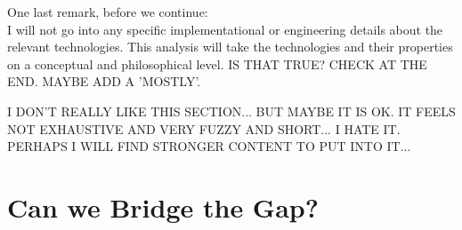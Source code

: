 \documentclass{article}
\newcounter{example}
\begin{document}
One last remark, before we continue:\\

I will not go into any specific implementational or engineering details about
the relevant technologies. This analysis will take the technologies and their
properties on a conceptual and philosophical level. IS THAT TRUE? CHECK AT THE
END. MAYBE ADD A 'MOSTLY'.
%
%
%
%
%
%
%

I DON'T REALLY LIKE THIS SECTION... BUT MAYBE IT IS OK. IT FEELS NOT EXHAUSTIVE
AND VERY FUZZY AND SHORT... I HATE IT. PERHAPS I WILL FIND STRONGER CONTENT TO
PUT INTO IT...

\section{Can we Bridge the Gap?}
\end{document}
